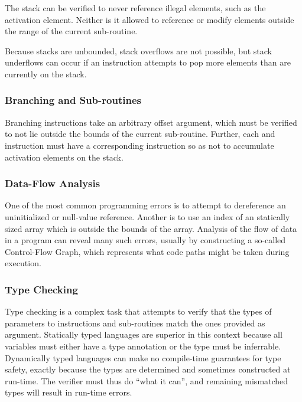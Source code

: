 The stack can be verified to never reference illegal elements, such as the
activation element. Neither is it allowed to reference or modify elements
outside the range of the current sub-routine.

Because stacks are unbounded, stack overflows are not possible, but stack
underflows can occur if an instruction attempts to pop more elements than are
currently on the stack.

\subsubsection{Branching and Sub-routines}
\label{sec:separate-components:verifier:branch}

Branching instructions take an arbitrary offset argument, which must be verified
to not lie outside the bounds of the current sub-routine. Further, each
 and  instruction must have a corresponding
 instruction so as not to accumulate activation elements on the
stack.

\subsubsection{Data-Flow Analysis}

One of the most common programming errors is to attempt to dereference an
uninitialized or null-value reference. Another is to use an index of an
statically sized array which is outside the bounds of the array. Analysis of the
flow of data in a program can reveal many such errors, usually by constructing a
so-called Control-Flow Graph, which represents what code paths might be taken
during execution.

\subsubsection{Type Checking}

Type checking is a complex task that attempts to verify that the types of
parameters to instructions and sub-routines match the ones provided as
argument. Statically typed languages are superior in this context because all
variables must either have a type annotation or the type must be
inferrable. Dynamically typed languages can make no compile-time guarantees for
type safety, exactly because the types are determined and sometimes constructed
at run-time. The verifier must thus do ``what it can'', and remaining mismatched
types will result in run-time errors.

